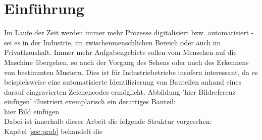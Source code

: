 
\chapter{Einführung}
\label{sec:intro}
	
	Im Laufe der Zeit werden immer mehr Prozesse digitalisiert bzw. 
	automatisiert - sei es in der Industrie, im zwischenmenschlichen 
	Bereich oder auch im Privathaushalt. Immer mehr Aufgabengebiete sollen vom 
	Menschen auf die Maschine übergehen, so auch der Vorgang des Sehens oder 
	auch des Erkennens von bestimmten Mustern. Dies ist für Industriebetriebe 
	insofern interessant, da es beispielsweise eine automatisierte 
	Identifizierung von Bauteilen anhand eines darauf eingravierten 
	Zeichencodes ermöglicht. Abbildung 'hier Bildreferenz einfügen' illustriert 
	exemplarisch ein derartiges Bauteil:\\
	
	hier Bild einfügen \\
	
	
	
	Dabei ist innerhalb dieser Arbeit die folgende Struktur vorgesehen: \\
	Kapitel \ref{sec:prob} behandelt die 
		